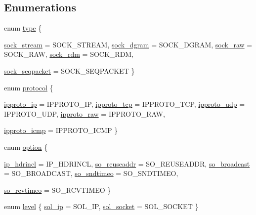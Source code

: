 \subsection*{Enumerations}
\begin{CompactItemize}
\item 
enum \hyperlink{namespacesocketpp_635f4c3b3f85aba331587404d59ae52d}{type} \{ \par
\hyperlink{namespacesocketpp_635f4c3b3f85aba331587404d59ae52de143592455509a8551e0fa943d772b4b}{sock\_\-stream} =  SOCK\_\-STREAM, 
\hyperlink{namespacesocketpp_635f4c3b3f85aba331587404d59ae52df52f36418990c9bbf4e7949e1f9ff0ee}{sock\_\-dgram} =  SOCK\_\-DGRAM, 
\hyperlink{namespacesocketpp_635f4c3b3f85aba331587404d59ae52d7b7c5341d5909dbbfcaa3fe1c04c949d}{sock\_\-raw} =  SOCK\_\-RAW, 
\hyperlink{namespacesocketpp_635f4c3b3f85aba331587404d59ae52da9b74c88a8baf194644eb089ae6457f4}{sock\_\-rdm} =  SOCK\_\-RDM, 
\par
\hyperlink{namespacesocketpp_635f4c3b3f85aba331587404d59ae52d0ae85ce0e589a95e5f14d6cdeecbbd45}{sock\_\-seqpacket} =  SOCK\_\-SEQPACKET
 \}
\item 
enum \hyperlink{namespacesocketpp_2969678def1c6c8cb4102802ca82e2cf}{protocol} \{ \par
\hyperlink{namespacesocketpp_2969678def1c6c8cb4102802ca82e2cfd8acf62568228b356df343026beade8e}{ipproto\_\-ip} =  IPPROTO\_\-IP, 
\hyperlink{namespacesocketpp_2969678def1c6c8cb4102802ca82e2cf94f358c113043dc156bb95873844546d}{ipproto\_\-tcp} =  IPPROTO\_\-TCP, 
\hyperlink{namespacesocketpp_2969678def1c6c8cb4102802ca82e2cfc2d1745e811f3d9addde50aad5e8ac9f}{ipproto\_\-udp} =  IPPROTO\_\-UDP, 
\hyperlink{namespacesocketpp_2969678def1c6c8cb4102802ca82e2cf23bb252119b970b87c8705d2d3f304a3}{ipproto\_\-raw} =  IPPROTO\_\-RAW, 
\par
\hyperlink{namespacesocketpp_2969678def1c6c8cb4102802ca82e2cfdb0258c0c773db97d6c9eac3f9485219}{ipproto\_\-icmp} =  IPPROTO\_\-ICMP
 \}
\item 
enum \hyperlink{namespacesocketpp_ea335944de1f6b81489c90507884cfc4}{option} \{ \par
\hyperlink{namespacesocketpp_ea335944de1f6b81489c90507884cfc470df783608fa9cb2b9cb450fb7027a65}{ip\_\-hdrincl} =  IP\_\-HDRINCL, 
\hyperlink{namespacesocketpp_ea335944de1f6b81489c90507884cfc4ef3c9ddad8c80879ccd993f0cbf2ddaa}{so\_\-reuseaddr} =  SO\_\-REUSEADDR, 
\hyperlink{namespacesocketpp_ea335944de1f6b81489c90507884cfc49396ae8f83e53dfde8b5d07f2e0668a3}{so\_\-broadcast} =  SO\_\-BROADCAST, 
\hyperlink{namespacesocketpp_ea335944de1f6b81489c90507884cfc45358c0a824b24bb17b03805a8fb60a52}{so\_\-sndtimeo} =  SO\_\-SNDTIMEO, 
\par
\hyperlink{namespacesocketpp_ea335944de1f6b81489c90507884cfc4ecd98d0c015681e55d1877cf27011440}{so\_\-rcvtimeo} =  SO\_\-RCVTIMEO
 \}
\item 
enum \hyperlink{namespacesocketpp_4dbb83d08769b55fc6e283b73ae11bb5}{level} \{ \hyperlink{namespacesocketpp_4dbb83d08769b55fc6e283b73ae11bb5d7ddf065e140601e3ad93d72e6c787ab}{sol\_\-ip} =  SOL\_\-IP, 
\hyperlink{namespacesocketpp_4dbb83d08769b55fc6e283b73ae11bb568097d5b8690a9619c42192ee5da5252}{sol\_\-socket} =  SOL\_\-SOCKET
 \}
\end{CompactItemize}
